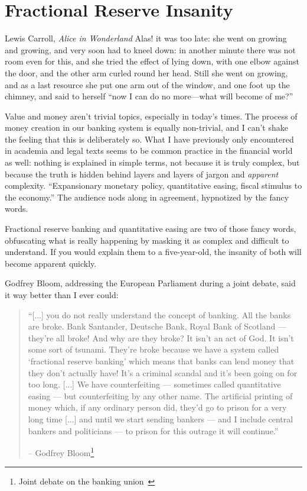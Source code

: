\chapter{Fractional Reserve Insanity}
\label{les:13}

\begin{chapquote}{Lewis Carroll, \textit{Alice in Wonderland}}
Alas! it was too late: she went on growing and growing, and very soon had to
kneel down: in another minute there was not room even for this, and she tried
the effect of lying down, with one elbow against the door, and the other arm
curled round her head. Still she went on growing, and as a last resource she put
one arm out of the window, and one foot up the chimney, and said to herself
\enquote{now I can do no more—what will become of me?}
\end{chapquote}

Value and money aren't trivial topics, especially in today's times. The
process of money creation in our banking system is equally non-trivial,
and I can't shake the feeling that this is deliberately so. What I have
previously only encountered in academia and legal texts seems to be
common practice in the financial world as well: nothing is explained in
simple terms, not because it is truly complex, but because the truth is
hidden behind layers and layers of jargon and \textit{apparent} complexity.
\enquote{Expansionary monetary policy, quantitative easing, fiscal stimulus to
the economy.} The audience nods along in agreement, hypnotized by the
fancy words.

Fractional reserve banking and quantitative easing are two of those
fancy words, obfuscating what is really happening by masking it as
complex and difficult to understand. If you would explain them to a
five-year-old, the insanity of both will become apparent quickly.

Godfrey Bloom, addressing the European Parliament during a joint
debate, said it way better than I ever could:

\begin{quotation}\begin{samepage}
\enquote{[...] you do not really understand the concept of banking. All the
banks are broke. Bank Santander, Deutsche Bank, Royal Bank of
Scotland --- they're all broke! And why are they broke? It isn't an
act of God. It isn't some sort of tsunami. They're broke because we
have a system called `fractional reserve banking' which means that
banks can lend money that they don't actually have! It's a criminal
scandal and it's been going on for too long. [...]
We have counterfeiting --- sometimes called quantitative
easing --- but counterfeiting by any other name. The artificial
printing of money which, if any ordinary person did, they'd go to
prison for a very long time [...] and until we start sending
bankers --- and I include central bankers and politicians --- to
prison for this outrage it will continue.}
\begin{flushright} -- Godfrey Bloom\footnote{Joint debate on the
banking union~\cite{godfrey-bloom}}
\end{flushright}\end{samepage}\end{quotation}

